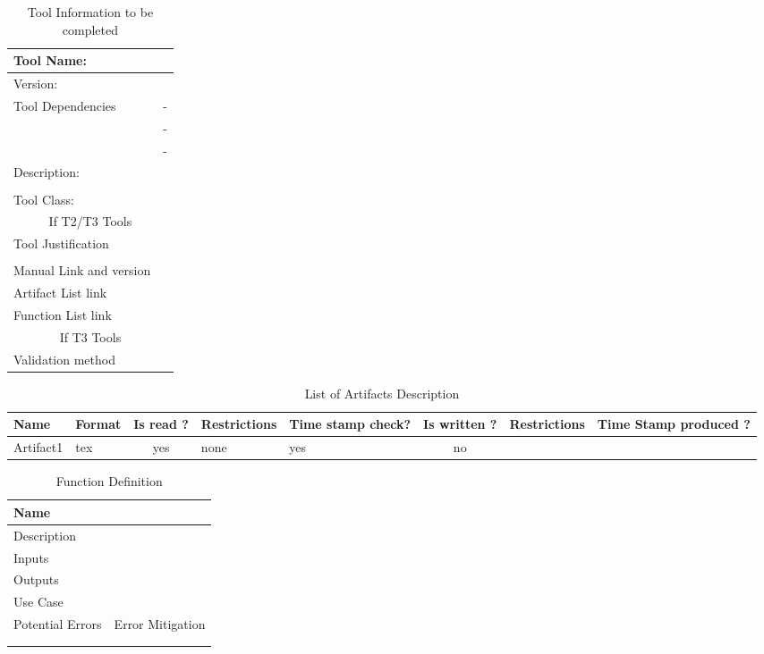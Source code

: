 \begin{table}[htbp]
\centering
\caption{\label{tbl:tool-info}Tool Information to be completed}
\begin{tabular}{|l|p{5cm}|}\hline
Tool Name: &\\\hline
Version: & \\\hline
Tool Dependencies & -\\
 & -\\
 & -\\ \hline
Description: & \\
 & \\ \hline
Tool Class: & \\\hline
\multicolumn{2}{|c|}{If T2/T3 Tools}\\\hline
Tool Justification & \\
 & \\ \hline
Manual Link and version & \\\hline
Artifact List link & \\\hline
Function List link& \\\hline
\multicolumn{2}{|c|}{If T3 Tools}\\\hline
Validation method& \\\hline
\end{tabular}
\end{table}


\begin{table}[htbp]
\caption{\label{tbl:artifacts} List of  Artifacts Description}
{\small
\begin{tabular}{|p{4em}|l|c|l|p{5em}|c|l|p{5em}|}\hline
Name & Format & Is read ? & Restrictions & Time stamp check? &Is
written ? & Restrictions & Time Stamp produced ?\\\hline
Artifact1 & tex &yes &none&yes&no&&\\\hline
\end{tabular}
}
\end{table}


\begin{table}[htbp]
\centering
\caption{\label{tbl:functions} Function Definition}
\begin{tabular}{|p{5cm}|p{5cm}|}\hline
Name&\\\hline
Description& \\\hline
Inputs & \\\hline
Outputs & \\\hline
Use Case & \\\hline\hline
Potential Errors & Error Mitigation \\\hline
&  \\\hline
&  \\\hline
\end{tabular}
\end{table}

